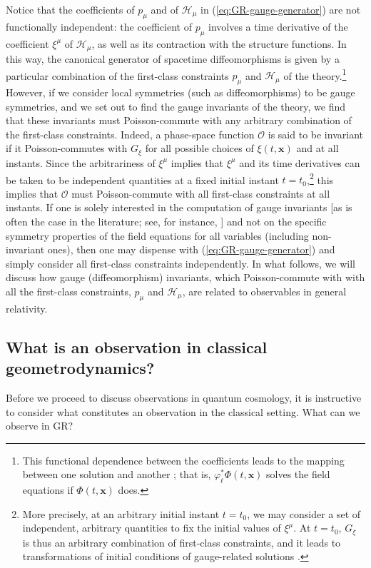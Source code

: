 \documentclass[12pt]{iopart}
\def\eref#1{(\ref{eq:#1})}
\def\Ob{\mathcal{O}}
\def\x{\mathbf{x}}
\begin{document}
Notice that the coefficients of $p_{\mu}$ and of $\mathcal{H}_{\mu}$ in \eref{GR-gauge-generator} are not functionally independent: the coefficient of $p_{\mu}$ involves a time derivative of the coefficient $\xi^{\mu}$ of $\mathcal{H}_{\mu}$, as well as its contraction with the structure functions. In this way, the canonical generator of spacetime diffeomorphisms is given by a particular combination of the first-class constraints $p_{\mu}$ and $\mathcal{H}_{\mu}$ of the theory.\footnote{This functional dependence between the coefficients leads to the mapping between one solution and another \citep{Pons:1996av,Pons:1999xu,Pons:2010ad}; that is, $\varphi_{\ell}^*\Phi(t,\x)$ solves the field equations if $\Phi(t,\x)$ does.} However, if we consider local symmetries (such as diffeomorphisms) to be gauge symmetries, and we set out to find the gauge invariants of the theory, we find that these invariants must Poisson-commute with any arbitrary combination of the first-class constraints. Indeed, a phase-space function $\Ob$ is said to be invariant if it Poisson-commutes with $G_{\xi}$ for all possible choices of $\xi(t,\x)$ and at all instants. Since the arbitrariness of $\xi^{\mu}$ implies that $\xi^{\mu}$ and its time derivatives can be taken to be independent quantities at a fixed initial instant $t=t_0$,\footnote{More precisely, at an arbitrary initial instant $t=t_0$, we may consider a set of independent, arbitrary quantities to fix the initial values of $\xi^{\mu}$. At $t=t_0$, $G_{\xi}$ is thus an arbitrary combination of first-class constraints, and it leads to transformations of initial conditions of gauge-related solutions \citep{Pons:1996av,Pons:1999xu,Pons:2010ad}.} this implies that $\Ob$ must Poisson-commute with all first-class constraints at all instants. If one is solely interested in the computation of gauge invariants [as is often the case in the literature; see, for instance, \cite{HT:book}] and not on the specific symmetry properties of the field equations for all variables (including non-invariant ones), then one may dispense with \eref{GR-gauge-generator} and simply consider all first-class constraints independently. In what follows, we will discuss how gauge (diffeomorphism) invariants, which Poisson-commute with with all the first-class constraints, $p_{\mu}$ and $\mathcal{H}_{\mu}$, are related to observables in general relativity.

\subsection{
\label{sec:relobs}What is an observation in classical geometrodynamics?}
Before we proceed to discuss observations in quantum cosmology, it is instructive to consider what constitutes an observation in the classical setting. What can we observe in GR?
\end{document}
